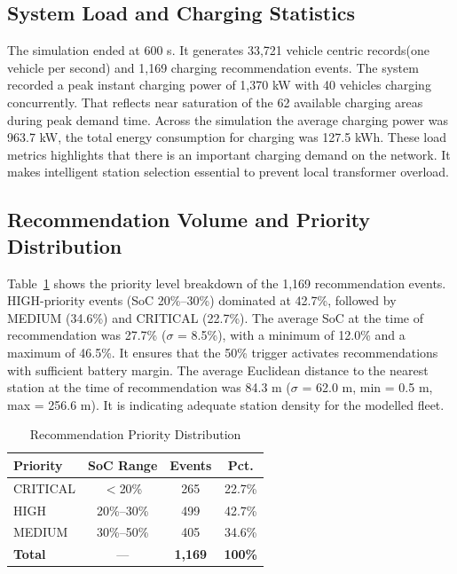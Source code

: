 \documentclass[conference]{IEEEtran}
\begin{document}
\subsection{System Load and Charging Statistics}

The simulation ended at 600 s. It generates 33,721 vehicle centric
records(one vehicle per second) and 1,169 charging recommendation
events. The system recorded a peak instant charging power of 1,370 kW
with 40 vehicles charging concurrently. That reflects near saturation
of the 62 available charging areas during peak demand time. Across the
simulation the average charging power was 963.7 kW, the total energy
consumption for charging was 127.5 kWh. These load metrics highlights
that there is an important charging demand on the network. It makes
intelligent station selection essential to prevent local transformer
overload.

\subsection{Recommendation Volume and Priority Distribution}

Table~\ref{tab:priority} shows the priority level breakdown of the
1,169 recommendation events. HIGH-priority events (SoC 20\%--30\%)
dominated at 42.7\%, followed by MEDIUM (34.6\%) and CRITICAL (22.7\%).
The average SoC at the time of recommendation was 27.7\%
($\sigma$ = 8.5\%), with a minimum of 12.0\% and a maximum of 46.5\%.
It ensures that the 50\% trigger activates recommendations with
sufficient battery margin. The average Euclidean distance to the
nearest station at the time of recommendation was 84.3 m
($\sigma$ = 62.0 m, min = 0.5 m, max = 256.6 m). It is indicating
adequate station density for the modelled fleet.

\begin{table}[htbp]
\caption{Recommendation Priority Distribution}
\label{tab:priority}
\begin{center}
\begin{tabular}{|l|c|c|c|}
\hline
\textbf{Priority} & \textbf{SoC Range} & \textbf{Events} & \textbf{Pct.} \\
\hline
CRITICAL & $<$20\%      & 265 & 22.7\% \\
\hline
HIGH     & 20\%--30\%   & 499 & 42.7\% \\
\hline
MEDIUM   & 30\%--50\%   & 405 & 34.6\% \\
\hline
\textbf{Total} & ---    & \textbf{1,169} & \textbf{100\%} \\
\hline
\end{tabular}
\end{center}
\end{table}
\end{document}
